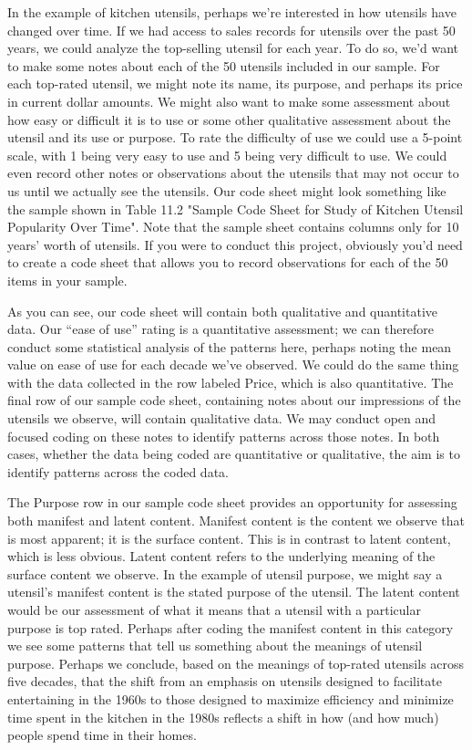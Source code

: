 In the example of kitchen utensils, perhaps we’re interested in how utensils have changed over time. If we had access to sales records for utensils over the past 50 years, we could analyze the top-selling utensil for each year. To do so, we’d want to make some notes about each of the 50 utensils included in our sample. For each top-rated utensil, we might note its name, its purpose, and perhaps its price in current dollar amounts. We might also want to make some assessment about how easy or difficult it is to use or some other qualitative assessment about the utensil and its use or purpose. To rate the difficulty of use we could use a 5-point scale, with 1 being very easy to use and 5 being very difficult to use. We could even record other notes or observations about the utensils that may not occur to us until we actually see the utensils. Our code sheet might look something like the sample shown in Table 11.2 "Sample Code Sheet for Study of Kitchen Utensil Popularity Over Time". Note that the sample sheet contains columns only for 10 years’ worth of utensils. If you were to conduct this project, obviously you’d need to create a code sheet that allows you to record observations for each of the 50 items in your sample.

As you can see, our code sheet will contain both qualitative and quantitative data. Our “ease of use” rating is a quantitative assessment; we can therefore conduct some statistical analysis of the patterns here, perhaps noting the mean value on ease of use for each decade we’ve observed. We could do the same thing with the data collected in the row labeled Price, which is also quantitative. The final row of our sample code sheet, containing notes about our impressions of the utensils we observe, will contain qualitative data. We may conduct open and focused coding on these notes to identify patterns across those notes. In both cases, whether the data being coded are quantitative or qualitative, the aim is to identify patterns across the coded data.

The Purpose row in our sample code sheet provides an opportunity for assessing both manifest and latent content. Manifest content is the content we observe that is most apparent; it is the surface content. This is in contrast to latent content, which is less obvious. Latent content refers to the underlying meaning of the surface content we observe. In the example of utensil purpose, we might say a utensil’s manifest content is the stated purpose of the utensil. The latent content would be our assessment of what it means that a utensil with a particular purpose is top rated. Perhaps after coding the manifest content in this category we see some patterns that tell us something about the meanings of utensil purpose. Perhaps we conclude, based on the meanings of top-rated utensils across five decades, that the shift from an emphasis on utensils designed to facilitate entertaining in the 1960s to those designed to maximize efficiency and minimize time spent in the kitchen in the 1980s reflects a shift in how (and how much) people spend time in their homes.

